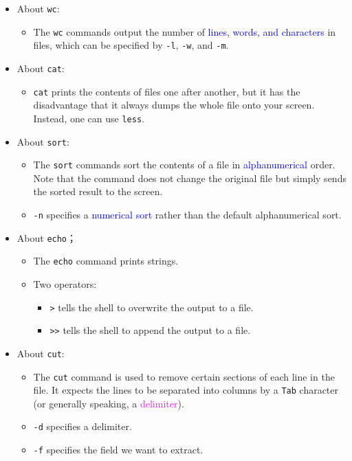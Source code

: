 \documentclass[UTF8]{book}
\newcommand{\code}[1]{\colorbox{codegray}{\texttt{#1}}}
\begin{document}
\begin{itemize}
\begin{itemize}
\begin{itemize}
	\end{itemize}
\end{itemize}
\item About \code{wc}:
\begin{itemize}
	\item The \code{wc} commands output the number of \textcolor{blue}{lines, words, and characters} in files, which can be specified by \code{-l}, \code{-w}, and \code{-m}.
\end{itemize}
\item About \code{cat}:
\begin{itemize}
	\item \code{cat} prints the contents of files one after another, but it has the disadvantage that it always dumps the whole file onto your screen. Instead, one can use \code{less}.
\end{itemize}
\item About \code{sort}:
\begin{itemize}
	\item The \code{sort} commands sort the contents of a file in \textcolor{blue}{alphanumerical} order. Note that the command does not change the original file but simply sends the sorted result to the screen.
	\item \code{-n} specifies a \textcolor{blue}{numerical sort} rather than the default alphanumerical sort.
\end{itemize}
\item About \code{echo}；
\begin{itemize}
	\item The \code{echo} command prints strings.
	\item Two operators:
	\begin{itemize}
		\item \code{>} tells the shell to overwrite the output to a file.
		\item \code{>>} tells the shell to append the output to a file.
	\end{itemize}
\end{itemize}
\item About \code{cut}:
\begin{itemize}
	\item The \code{cut} command is used to remove certain sections of each line in the file. It expects the lines to be separated into columns by a \code{Tab} character (or generally speaking, a \textcolor{magenta}{delimiter}).
	\item \code{-d} specifies a delimiter.
	\item \code{-f} specifies the field we want to extract.

\end{itemize}
\end{itemize}
\end{document}
